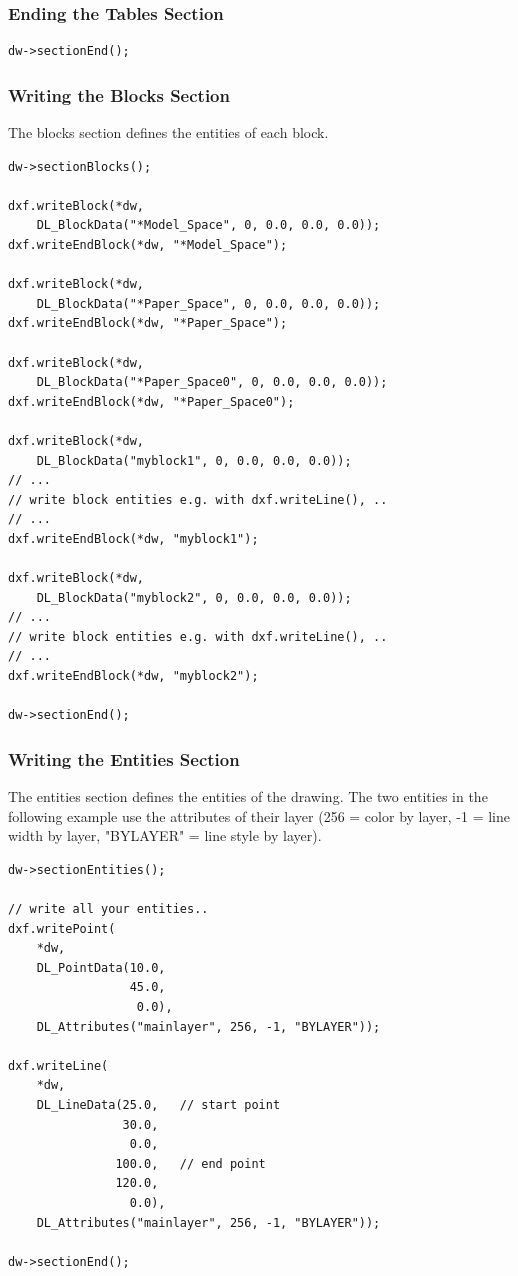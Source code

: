 \subsubsection*{Ending the Tables Section}

\begin{verbatim}
dw->sectionEnd();
\end{verbatim}

\subsubsection{Writing the Blocks Section}
The blocks section defines the entities of each block.

\begin{verbatim}
dw->sectionBlocks();

dxf.writeBlock(*dw, 
    DL_BlockData("*Model_Space", 0, 0.0, 0.0, 0.0));
dxf.writeEndBlock(*dw, "*Model_Space");

dxf.writeBlock(*dw, 
    DL_BlockData("*Paper_Space", 0, 0.0, 0.0, 0.0));
dxf.writeEndBlock(*dw, "*Paper_Space");

dxf.writeBlock(*dw, 
    DL_BlockData("*Paper_Space0", 0, 0.0, 0.0, 0.0));
dxf.writeEndBlock(*dw, "*Paper_Space0");

dxf.writeBlock(*dw,
    DL_BlockData("myblock1", 0, 0.0, 0.0, 0.0));
// ...
// write block entities e.g. with dxf.writeLine(), ..
// ...
dxf.writeEndBlock(*dw, "myblock1");

dxf.writeBlock(*dw,
    DL_BlockData("myblock2", 0, 0.0, 0.0, 0.0));
// ...
// write block entities e.g. with dxf.writeLine(), ..
// ...
dxf.writeEndBlock(*dw, "myblock2");

dw->sectionEnd();
\end{verbatim}

\subsubsection{Writing the Entities Section}
The entities section defines the entities of the drawing. The two entities in the following example use the attributes of their layer (256 = color by layer, -1 = line width by layer, "BYLAYER" = line style by layer).




\begin{verbatim}
dw->sectionEntities();

// write all your entities..
dxf.writePoint(
    *dw,
    DL_PointData(10.0,
                 45.0,
                  0.0),
    DL_Attributes("mainlayer", 256, -1, "BYLAYER"));

dxf.writeLine(
    *dw,
    DL_LineData(25.0,   // start point
                30.0,
                 0.0,
               100.0,   // end point
               120.0,
                 0.0),
    DL_Attributes("mainlayer", 256, -1, "BYLAYER"));

dw->sectionEnd();
\end{verbatim}

